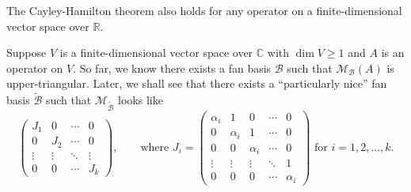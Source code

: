 \documentclass{ctexart}
\newcommand{\R}{\mathbb{R}}
\newcommand{\C}{\mathbb{C}}
\begin{document}
    \begin{myrmk}
        The Cayley-Hamilton theorem also holds for any operator on a finite-dimensional vector space over $\R$.
    \end{myrmk}
    \begin{myrmk}
        Suppose $V$ is a finite-dimensional vector space over $\C$ with $\dim V \ge 1$ and $A$ is an operator on $V$. So far, we know there exists a fan basis $\mathcal B$ such that $\mathcal M_{\mathcal{B}} (A)$ is upper-triangular. Later, we shall see that there exists a ``particularly nice'' fan basis $\tilde{\mathcal{B}}$ such that $\mathcal{M}_{\tilde{\mathcal{B}}}$ looks like
        $$
        \begin{pmatrix}
            J_1 & 0 & \cdots & 0 \\
            0 & J_2 & \cdots & 0 \\
            \vdots & \vdots & \ddots & \vdots \\
            0 & 0 & \cdots & J_k
        \end{pmatrix},
        \qquad
        \text{where }
        J_i =
        \begin{pmatrix}
            \alpha_i & 1 & 0 & \cdots & 0 \\
            0 & \alpha_i & 1 & \cdots & 0 \\
            0 & 0 & \alpha_i & \cdots & 0 \\
            \vdots & \vdots & \vdots & \ddots & 1 \\
            0 & 0 & 0 & \cdots & \alpha_i
        \end{pmatrix}
            \text{ for } i=1,2,\ldots,k.
        $$
    \end{myrmk}
\end{document}
